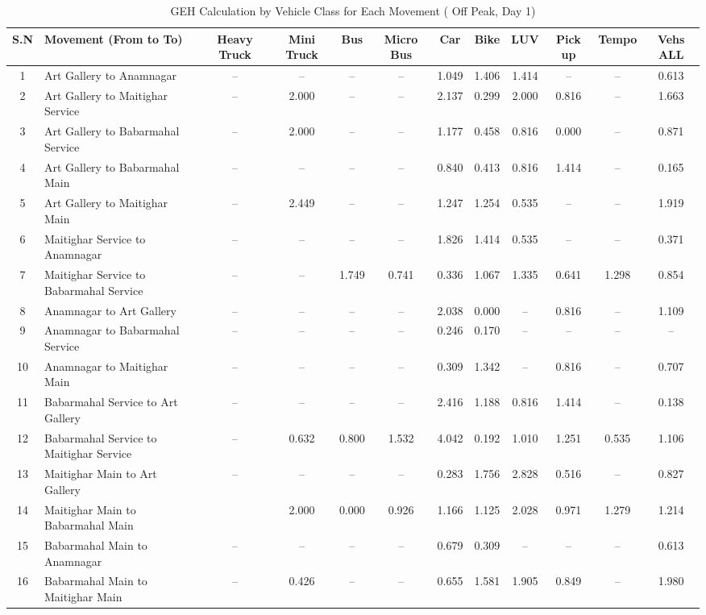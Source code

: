 \begin{landscape}
\begin{table}[h!]
\centering
\caption{GEH Calculation by Vehicle Class for Each Movement ( Off Peak, Day 1)}
\small
\setlength{\tabcolsep}{5pt}
    
\begin{tabular}{|c|p{6cm}|c|c|c|c|c|c|c|c|c|c|}
\hline
S.N& Movement (From to To)& Heavy Truck & Mini Truck & Bus & Micro Bus & Car & Bike & LUV & Pick up & Tempo & Vehs ALL \\ \hline
1	&Art Gallery to Anamnagar	            &–	&–	&–	&–	&1.049	&1.406	&1.414	&–	&–	&0.613 \\ \hline
2	&Art Gallery to Maitighar Service	    &–	&2.000	&–	&–	&2.137	&0.299	&2.000	&0.816	&–	&1.663 \\ \hline
3	&Art Gallery to Babarmahal Service	&–	&2.000	&–	&–	&1.177	&0.458	&0.816	&0.000	&–	&0.871 \\ \hline
4	&Art Gallery to Babarmahal Main	&–	&–	&–	&–	&0.840	&0.413	&0.816	&1.414	&–	&0.165 \\ \hline
5	&Art Gallery to Maitighar Main	&–	&2.449	&–	&–	&1.247	&1.254	&0.535	&–	&–	&1.919 \\ \hline
6	&Maitighar Service to Anamnagar	&–	&–	&–	&–	&1.826	&1.414	&0.535	&–	&–	&0.371 \\ \hline
7	&Maitighar Service to Babarmahal Service	&–	&–	&1.749	&0.741	&0.336	&1.067	&1.335	&0.641	&1.298	&0.854 \\ \hline
8	&Anamnagar to Art Gallery	&–	&–	&–	&–	&2.038	&0.000	&–	&0.816	&–	&1.109 \\ \hline
9	&Anamnagar to Babarmahal Service	&–	&–	&–	&–	&0.246	&0.170	&–	&–	&–	&– \\ \hline
10	&Anamnagar to Maitighar Main	&–	&–	&–	&–	&0.309	&1.342	&–	&0.816	&–	&0.707 \\ \hline
11	&Babarmahal Service to Art Gallery	&–	&–	&–	&–	&2.416	&1.188	&0.816	&1.414	&–	&0.138 \\ \hline
12	&Babarmahal Service to Maitighar Service	&–	&0.632	&0.800	&1.532	&4.042	&0.192	&1.010	&1.251	&0.535	&1.106 \\ \hline
13	&Maitighar Main to Art Gallery	&–	&–	&–	&–	&0.283	&1.756	&2.828	&0.516	&–	&0.827 \\ \hline
14	&Maitighar Main to Babarmahal Main	&   &2.000	&0.000	&0.926	&1.166	&1.125	&2.028	&0.971	&1.279	&1.214 \\ \hline
15	&Babarmahal Main to Anamnagar	&–	&–	&–	&–	&0.679	&0.309	&–	&–	&–	&0.613 \\ \hline
16	&Babarmahal Main to Maitighar Main	&–	&0.426	&–	&–	&0.655	&1.581	&1.905	&0.849	&–	&1.980 \\ \hline

\end{tabular}
\end{table}
\end{landscape}


